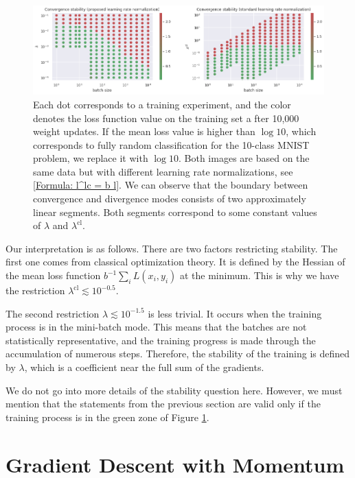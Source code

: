 \documentclass[12pt,a4paper]{amsart}
\numberwithin{equation}{section}
\theoremstyle{remark}
\begin{document}
\begin{figure}
	\centering
	\includegraphics[width=16cm,keepaspectratio=true]{images/convergence_stability.png}
	\caption{
		Each dot corresponds to a training experiment,
		and the color denotes the loss function value on the training set a
		fter 10,000 weight updates.
		If the mean loss value is higher than
		$\log 10$,
		which corresponds to fully random classification for the 10-class MNIST problem,
		we replace it with
		$\log 10$.
		Both images are based on the same data but with different learning rate normalizations,
		see
		\eqref{Formula: l^lc = b l}.
		We can observe that the boundary between convergence and divergence modes consists
		of two approximately linear segments. Both segments correspond to some constant values of
		$\lambda$
		and
		$\lambda^{\text{cl}}$.
	}
	\label{Fig: convergence stability}
\end{figure}

Our interpretation is as follows.
There are two factors restricting stability.
The first one comes from classical optimization theory.
It is defined by the Hessian of the mean loss function
$ b^{-1} \sum_{i}{L(x_i,y_i)} $
at the minimum.
This is why we have the restriction
$\lambda^{\text{cl}} \lesssim 10^{-0.5}$.

The second restriction
$\lambda \lesssim 10^{-1.5}$
is less trivial.
It occurs when the training process is in the mini-batch mode.
This means that the batches are not statistically representative,
and the training progress is made through the accumulation of numerous steps.
Therefore, the stability of the training is defined by
$\lambda$,
which is a coefficient near the full sum of the gradients.

We do not go into more details of the stability question here.
However, we must mention that the statements from the previous section
are valid only if the training process is in the green zone of Figure
\ref{Fig: convergence stability}.


\section{Gradient Descent with Momentum \label{Section: Gradient descent with momentum}}
\end{document}
